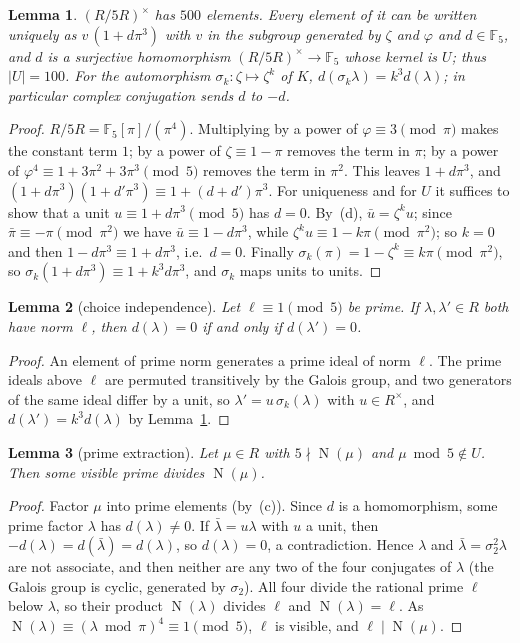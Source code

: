 \documentclass[11pt]{article}
\newtheorem{lemma}{Lemma}
\theoremstyle{definition}
\theoremstyle{remark}
\newcommand{\F}{\mathbb F_5}
\newcommand{\N}{\operatorname{N}}
\begin{document}
\begin{lemma}\label{lem:units}
$(R/5R)^\times$ has $500$ elements. Every element of it can be written
uniquely as $v\,(1+d\pi^3)$ with $v$ in the subgroup generated by $\zeta$ and
$\varphi$ and $d\in\F$, and $d$ is a surjective homomorphism
$(R/5R)^\times\to\F$ whose kernel is $U$; thus $|U|=100$. For the
automorphism $\sigma_k:\zeta\mapsto\zeta^k$ of $K$, $d(\sigma_k\lambda)=k^3d(\lambda)$;
in particular complex conjugation sends $d$ to $-d$.
\end{lemma}

\begin{proof}
$R/5R=\F[\pi]/(\pi^4)$. Multiplying by a power of $\varphi\equiv3\pmod\pi$
makes the constant term $1$; by a power of $\zeta\equiv1-\pi$ removes the term
in $\pi$; by a power of $\varphi^4\equiv1+3\pi^2+3\pi^3\pmod 5$ removes the
term in $\pi^2$. This leaves $1+d\pi^3$, and
$(1+d\pi^3)(1+d'\pi^3)\equiv1+(d+d')\pi^3$. For uniqueness and for $U$ it
suffices to show that a unit $u\equiv1+d\pi^3\pmod5$ has $d=0$. By~(d),
$\bar u=\zeta^ku$; since $\bar\pi\equiv-\pi\pmod{\pi^2}$ we have
$\bar u\equiv1-d\pi^3$, while $\zeta^ku\equiv1-k\pi\pmod{\pi^2}$; so $k=0$ and
then $1-d\pi^3\equiv1+d\pi^3$, i.e.\ $d=0$. Finally
$\sigma_k(\pi)=1-\zeta^k\equiv k\pi\pmod{\pi^2}$, so
$\sigma_k(1+d\pi^3)\equiv1+k^3d\pi^3$, and $\sigma_k$ maps units to units.
\end{proof}

\begin{lemma}[choice independence]\label{lem:choice}
Let $\ell\equiv1\pmod5$ be prime. If $\lambda,\lambda'\in R$ both have norm
$\ell$, then $d(\lambda)=0$ if and only if $d(\lambda')=0$.
\end{lemma}

\begin{proof}
An element of prime norm generates a prime ideal of norm $\ell$. The prime
ideals above $\ell$ are permuted transitively by the Galois group, and two
generators of the same ideal differ by a unit, so $\lambda'=u\,\sigma_k(\lambda)$
with $u\in R^\times$, and $d(\lambda')=k^3d(\lambda)$ by
Lemma~\ref{lem:units}.
\end{proof}

\begin{lemma}[prime extraction]\label{lem:extract}
Let $\mu\in R$ with $5\nmid\N(\mu)$ and $\mu\bmod 5\notin U$. Then some
visible prime divides $\N(\mu)$.
\end{lemma}

\begin{proof}
Factor $\mu$ into prime elements (by~(c)). Since $d$ is a homomorphism, some
prime factor $\lambda$ has $d(\lambda)\ne0$. If $\bar\lambda=u\lambda$ with
$u$ a unit, then $-d(\lambda)=d(\bar\lambda)=d(\lambda)$, so $d(\lambda)=0$, a
contradiction. Hence $\lambda$ and $\bar\lambda=\sigma_2^2\lambda$ are not
associate, and then neither are any two of the four conjugates of $\lambda$
(the Galois group is cyclic, generated by $\sigma_2$). All four divide the
rational prime $\ell$ below $\lambda$, so their product $\N(\lambda)$ divides
$\ell$ and $\N(\lambda)=\ell$. As $\N(\lambda)\equiv(\lambda\bmod\pi)^4\equiv1\pmod5$,
$\ell$ is visible, and $\ell\mid\N(\mu)$.
\end{proof}
\end{document}
